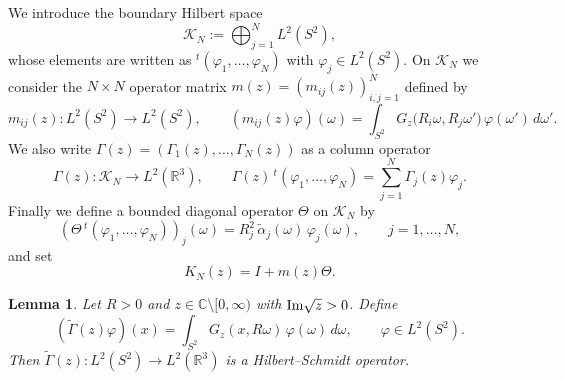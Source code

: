 \documentclass[a4paper,11pt]{article}
\numberwithin{equation}{section}
\def\re{\mathbb{R}}
\def\co{\mathbb{C}}
\renewcommand{\Im}{\text{{\rm Im}}}
\newtheorem{lem}[thm]{Lemma}
\theoremstyle{definition}
\theoremstyle{remark}
\begin{document}
We introduce the boundary Hilbert space
\begin{equation}\label{eq:HN-boundary-space}
\mathcal K_N := \bigoplus_{j=1}^N L^2(S^2),
\end{equation}
whose elements are written as ${}^{t}(\varphi_1,\dots,\varphi_N)$ with
$\varphi_j\in L^2(S^2)$.
On $\mathcal K_N$ we consider the $N\times N$ operator matrix
$m(z)=(m_{ij}(z))_{i,j=1}^N$ defined by
\begin{equation}\label{eq:Mij}
m_{ij}(z):L^2(S^2)\to L^2(S^2),\qquad
(m_{ij}(z)\varphi)(\omega)
=
\int_{S^2}G_z\bigl(R_i\omega,R_j\omega'\bigr)\,\varphi(\omega')\,d\omega'.
\end{equation}
We also write $\Gamma(z)=(\Gamma_1(z),\dots,\Gamma_N(z))$ as a column operator
$$
\Gamma(z):\mathcal K_N\to L^2(\re^3),\qquad
\Gamma(z)\,{}^{t}(\varphi_1,\dots,\varphi_N)
=
\sum_{j=1}^N \Gamma_j(z)\varphi_j .
$$
Finally we define a bounded diagonal operator $\Theta$ on $\mathcal K_N$ by
\begin{equation}\label{eq:ThetaN}
(\Theta\,{}^{t}(\varphi_1,\dots,\varphi_N))_j(\omega)
=
R_j^2\,\widetilde\alpha_j(\omega)\,\varphi_j(\omega),
\qquad j=1,\dots,N,
\end{equation}
and set
\begin{equation}\label{eq:K-def}
K_N(z)=I+m(z)\Theta .
\end{equation}


\begin{lem}\label{lem:gamma-HS}
Let $R>0$ and $z\in\co\setminus[0,\infty)$ with $\Im\sqrt z>0$.
Define
$$
(\widetilde{\Gamma}(z)\varphi)(x)
=
\int_{S^2}G_z(x,R\omega)\,\varphi(\omega)\,d\omega,
\qquad \varphi\in L^2(S^2).
$$
Then $\widetilde{\Gamma}(z):L^2(S^2)\to L^2(\re^3)$ is a Hilbert--Schmidt operator.
\end{lem}
\end{document}
